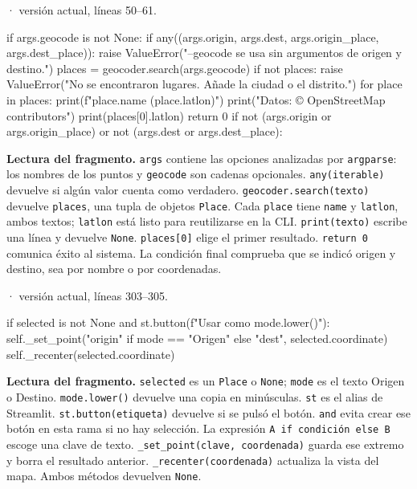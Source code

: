 \documentclass[11pt,a4paper]{article}
\begin{document}
\smallskip
{\footnotesize\texttt{} · versión actual, líneas 50--61.}\par
\begin{Codigo}[firstnumber=50]
            if args.geocode is not None:
                if any((args.origin, args.dest, args.origin_place, args.dest_place)):
                    raise ValueError("--geocode se usa sin argumentos de origen y destino.")
                places = geocoder.search(args.geocode)
                if not places:
                    raise ValueError("No se encontraron lugares. Añade la ciudad o el distrito.")
                for place in places:
                    print(f"{place.name} ({place.latlon})")
                print("Datos: © OpenStreetMap contributors")
                print(places[0].latlon)
                return 0
            if not (args.origin or args.origin_place) or not (args.dest or args.dest_place):
\end{Codigo}

\textbf{Lectura del fragmento.} \texttt{args} contiene las opciones analizadas por \texttt{argparse}: los nombres de los puntos y \texttt{geocode} son cadenas opcionales. \texttt{any(iterable)} devuelve si algún valor cuenta como verdadero. \texttt{geocoder.search(texto)} devuelve \texttt{places}, una tupla de objetos \texttt{Place}. Cada \texttt{place} tiene \texttt{name} y \texttt{latlon}, ambos textos; \texttt{latlon} está listo para reutilizarse en la CLI. \texttt{print(texto)} escribe una línea y devuelve \texttt{None}. \texttt{places[0]} elige el primer resultado. \texttt{return 0} comunica éxito al sistema. La condición final comprueba que se indicó origen y destino, sea por nombre o por coordenadas.


\smallskip
{\footnotesize\texttt{} · versión actual, líneas 303--305.}\par
\begin{Codigo}[firstnumber=303]
            if selected is not None and st.button(f"Usar como {mode.lower()}"):
                self._set_point("origin" if mode == "Origen" else "dest", selected.coordinate)
                self._recenter(selected.coordinate)
\end{Codigo}

\textbf{Lectura del fragmento.} \texttt{selected} es un \texttt{Place} o \texttt{None}; \texttt{mode} es el texto Origen o Destino. \texttt{mode.lower()} devuelve una copia en minúsculas. \texttt{st} es el alias de Streamlit. \texttt{st.button(etiqueta)} devuelve si se pulsó el botón. \texttt{and} evita crear ese botón en esta rama si no hay selección. La expresión \texttt{A if condición else B} escoge una clave de texto. \texttt{\_set\_point(clave, coordenada)} guarda ese extremo y borra el resultado anterior. \texttt{\_recenter(coordenada)} actualiza la vista del mapa. Ambos métodos devuelven \texttt{None}.
\end{document}
